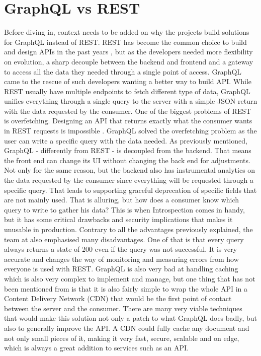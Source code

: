\section{GraphQL vs REST}
\label{s:GraphQLvsRest}

Before diving in, context needs to be added on why the projects build solutions
for GraphQL instead of REST. REST has become the common choice to build and
design APIs in the past years \citep{britoRESTVsGraphQL2020}, but as the
developers needed more flexibility on evolution, a sharp decouple between the
backend and frontend and a gateway to access all the data they needed through a
single point of access. GraphQL came to the rescue of such developers wanting a
better way to build API. While REST usually have multiple endpoints to fetch
different type of data, GraphQL unifies everything through a single query to the
server with a simple JSON return with the data requested by the consumer. One of
the biggest problems of REST is overfetching. Designing an API that returns
exactly what the consumer wants in REST requests is impossible
\citep{seabraRESTGraphQLPerformance2019}. GraphQL solved the overfetching
problem as the user can write a specific query with the data needed. As
previously mentioned, GraphQL - differently from REST - is decoupled from the
backend. That means the front end can change its UI without changing the back
end for adjustments. Not only for the same reason, but the backend also has
instrumental analytics on the data requested by the consumer since everything
will be requested through a specific query. That leads to supporting graceful
deprecation of specific fields that are not mainly used. That is alluring, but
how does a consumer know which query to write to gather his data? This is when
Introspection comes in handy, but it has some critical drawbacks and security
implications that makes it unusable in production. Contrary to all the
advantages previously explained, the team at
\citet{stablekernelAdvantagesDisadvantagesGraphQL2021} also emphasised many
disadvantages. One of that is that every query always returns a state of 200
even if the query was not successful. It is very accurate and changes the way of
monitoring and measuring errors from how everyone is used with REST. GraphQL is
also very bad at handling caching which is also very complex to implement and
manage, but one thing that has not been mentioned from
\citet{stablekernelAdvantagesDisadvantagesGraphQL2021} is that it is also fairly
simple to wrap the whole API in a Content Delivery Network (CDN) that would be
the first point of contact between the server and the consumer. There are many
very viable techniques that would make this solution not only a patch to what
GraphQL does badly, but also to generally improve the API. A CDN could fully
cache any document and not only small pieces of it, making it very fast, secure,
scalable and on edge, which is always a great addition to services such as an
API.

